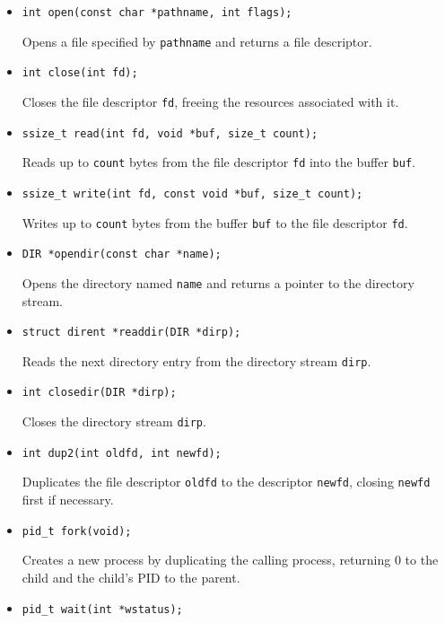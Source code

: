 \documentclass{article}
\begin{document}
\begin{itemize}

    \item \texttt{int open(const char *pathname, int flags);}
    
    Opens a file specified by \texttt{pathname} and returns a file descriptor.

    \item \texttt{int close(int fd);}
    
    Closes the file descriptor \texttt{fd}, freeing the resources associated with it.

    \item \texttt{ssize\_t read(int fd, void *buf, size\_t count);}
    
    Reads up to \texttt{count} bytes from the file descriptor \texttt{fd} into the buffer
    \texttt{buf}.

    \item \texttt{ssize\_t write(int fd, const void *buf, size\_t count);}
    
    Writes up to \texttt{count} bytes from the buffer \texttt{buf} to the file descriptor
    \texttt{fd}.

    \item \texttt{DIR *opendir(const char *name);}
    
    Opens the directory named \texttt{name} and returns a pointer to the directory stream.

    \item \texttt{struct dirent *readdir(DIR *dirp);}
    
    Reads the next directory entry from the directory stream \texttt{dirp}.

    \item \texttt{int closedir(DIR *dirp);}
    
    Closes the directory stream \texttt{dirp}.

    \item \texttt{int dup2(int oldfd, int newfd);}
    
    Duplicates the file descriptor \texttt{oldfd} to the descriptor \texttt{newfd}, closing
    \texttt{newfd} first if necessary.

    \item \texttt{pid\_t fork(void);}
    
    Creates a new process by duplicating the calling process, returning 0 to the child and the
    child's PID to the parent.

    \item \texttt{pid\_t wait(int *wstatus);}
    

\end{itemize}
\end{document}
